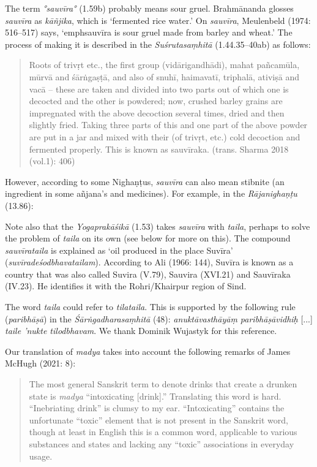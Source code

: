 \begin{ekdosis}
\begin{philcomm}[hp01_059]
The term \emph{°sauvīra°} (1.59b) probably means sour gruel. Brahmānanda glosses  \emph{sauvīra} as \emph{kāñjika}, which is `fermented rice water.' On \emph{sauvīra}, Meulenbeld (1974: 516–517) says, `emph{sauvīra} is sour gruel made from barley and wheat.' The process of making it is described in the \emph{Suśrutasaṃhitā} (1.44.35--40ab) as follows:

\begin{quote}
Roots of trivṛt etc., the first group (vidārigandhādi), mahat pañcamūla, mūrvā and śārṅgaṣṭā, and also of snuhī, haimavatī, triphalā, ativiṣā and vacā -- these are taken and divided into two parts out of which one is decocted and the other is powdered; now, crushed barley grains are impregnated with the above decoction several times, dried and then slightly fried. Taking three parts of this and one part of the above powder are put in a jar and mixed with their (of trivṛt, etc.) cold decoction and fermented properly. This is known as sauvīraka. (trans. Sharma 2018 (vol.1): 406)
\end{quote}

However, according to some Nighaṇṭus, \emph{sauvīra} can also mean stibnite (an ingredient in some añjana’s and medicines). For example, in the \emph{Rājanighaṇṭu} (13.86):


\begin{versinnote}
\end{versinnote}

Note also that the \emph{Yogaprakāśikā} (1.53) takes \emph{sauvīra} with \emph{taila}, perhaps to solve the problem of \emph{taila} on its own (see below for more on this). The compound \emph{sauvīrataila} is explained as `oil produced in the place Suvīra' (\emph{suvīradeśodbhavatailam}). According to Ali (1966: 144), Suvīra is known as a country that was also called Suvira (V.79), Sauvira (XVI.21) and Sauvīraka (IV.23). He identifies it with the Rohri/Khairpur region of Sind. 

The word \emph{taila} could refer to \emph{tilataila}. This is supported by the following rule (\emph{paribhāṣā}) in the \emph{Śārṅgadharasaṃhitā} (48):
\emph{anuktāvasthāyāṃ paribhāṣāvidhiḥ} [...] \emph{taile ’nukte tilodbhavam}. We thank Dominik Wujastyk for this reference.  

Our translation of \emph{madya} takes into account the following remarks of James McHugh (2021: 8):
\begin{quote}
    The most general Sanskrit term to denote drinks that create a drunken state is \emph{madya} “intoxicating [drink].” Translating this word is hard. “Inebriating drink” is clumsy to my ear. “Intoxicating” contains the unfortunate “toxic” element that is not present in the Sanskrit word, though at least in English this is a common word, applicable to various substances and states and lacking any “toxic” associations in everyday usage.
\end{quote}


\end{philcomm}
\end{ekdosis}
